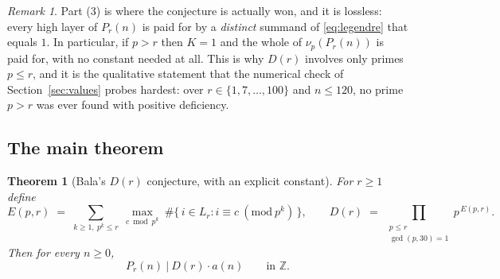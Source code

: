 \documentclass[11pt]{article}
\theoremstyle{plain}
\newtheorem{theorem}{Theorem}[section]
\theoremstyle{definition}
\theoremstyle{remark}
\newtheorem*{remark}{Remark}
\numberwithin{equation}{section}
\newcommand{\Z}{\mathbb{Z}}
\newcommand{\Lr}{L_r}
\begin{document}
\begin{remark}
Part (3) is where the conjecture is actually won, and it is lossless: every high layer of
$P_r(n)$ is paid for by a \emph{distinct} summand of \eqref{eq:legendre} that equals $1$. In
particular, if $p > r$ then $K = 1$ and the whole of $\nu_p(P_r(n))$ is paid for, with no
constant needed at all. This is why $D(r)$ involves only primes $p \le r$, and it is the
qualitative statement that the numerical check of Section~\ref{sec:values} probes hardest: over
$r \in \{1,7,\dots,100\}$ and $n \le 120$, no prime $p > r$ was ever found with positive
deficiency.
\end{remark}

\subsection{The main theorem}

\begin{theorem}[Bala's $D(r)$ conjecture, with an explicit constant]
\label{thm:main}
For $r \ge 1$ define
\[
  E(p,r) \;=\; \sum_{k \ge 1,\ p^k \le r}\ \max_{c \bmod p^k}\
    \#\{\, i \in \Lr : i \equiv c \ (\mathrm{mod}\ p^k)\,\},
  \qquad
  D(r) \;=\; \prod_{\substack{p \le r\\ \gcd(p,30)=1}} p^{\,E(p,r)} .
\]
Then for every $n \ge 0$,
\[
  P_r(n) \ \Big|\ D(r)\cdot a(n) \qquad \text{in } \Z .
\]
\end{theorem}
\end{document}
